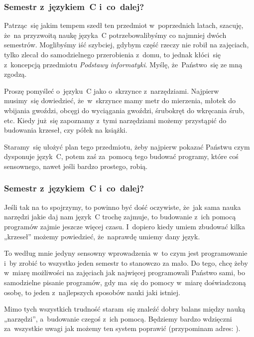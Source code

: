 \documentclass[10pt,t]{beamer}
\begin{document}
\begin{frame}
  \frametitle{Semestr z~językiem~C i~co~dalej?}


  Patrząc~się jakim tempem szedł ten przedmiot w~poprzednich latach,
  szacuję, że~na przyzwoitą naukę języka~C potrzebowalibyśmy co najmniej
  dwóch semestrów. Moglibyśmy iść szybciej, gdybym część rzeczy nie robił
  na zajęciach, tylko zlecał do samodzielnego przerobienia z~domu, to
  jednak kłóci~się z~koncepcją przedmiotu \textit{\alert{Podstawy}
    informatyki}. Myślę, że~Państwo~się ze mną zgodzą.

  Proszę pomyśleć o~języku~C jako o~skrzynce z~narzędziami. Najpierw
  musimy~się dowiedzieć, że~w~skrzynce mamy metr do mierzenia,
  młotek do wbijania gwoździ, obcęgi do wyciągania gwoździ, śrubokręt do
  wkręcania śrub, etc. Kiedy już~się zapoznamy z~tymi narzędziami możemy
  przystąpić do budowania krzeseł, czy półek na książki.

  Staramy~się ułożyć plan tego przedmiotu, żeby najpierw pokazać Państwu
  czym dysponuje język~C, potem zaś za~pomocą tego budować programy, które
  coś sensownego, nawet jeśli bardzo prostego, robią.

\end{frame}





\begin{frame}
  \frametitle{Semestr z~językiem~C i~co~dalej?}


  Jeśli tak na to spojrzymy, to powinno być dość oczywiste, że~jak sama
  nauka narzędzi jakie daj nam język~C trochę zajmuje, to budowanie z~ich
  pomocą programów zajmie jeszcze więcej czasu. I~dopiero kiedy umiem
  zbudować kilka „krzeseł” możemy powiedzieć, że~naprawdę umiemy dany język.

  To według mnie jedyny sensowny wprowadzenia w~to czym jest programowanie
  i~by zrobić to wszystko jeden semestr to stanowczo za mało. Do tego, chcę
  żeby w~miarę możliwości na zajęciach jak najwięcej programowali Państwo
  sami, bo samodzielne pisanie programów, gdy ma~się do pomocy w~miarę
  doświadczoną osobę, to jeden z~najlepszych sposobów nauki jaki istniej.

  Mimo tych wszystkich trudność staram~się znaleźć dobry balans między nauką
  „narzędzi”, a~budowanie czegoś z~ich pomocą. Będziemy bardzo wdzięczni
  za~wszystkie uwagi jak możemy ten system poprawić (przypominam adres:
  \email).

\end{frame}
\end{document}
